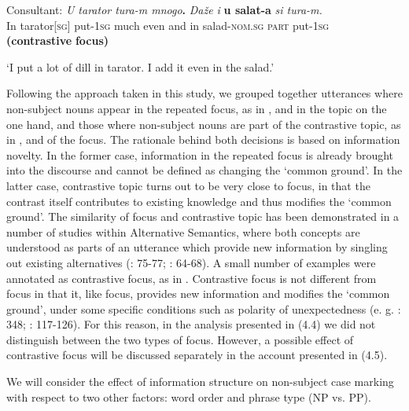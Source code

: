 \documentclass[output=paper]{langscibook}
\begin{document}
       Consultant:   \textit{U tarator tura-m       mnogo}\textbf{.         }\textit{Daže    i}\textbf{   \textbf{u} \textbf{salat-a}               }\textit{si      tura-m.} \\
                              In tarator[\textsc{sg}]  put-1\textsc{sg}  much      even  and  in salad-\textsc{nom.sg}    \textsc{part}   put-1\textsc{sg}  \textbf{\\
}                                                                              \textbf{(contrastive} \textbf{focus)}

      ‘I put a lot of dill in tarator. I add it even in the salad.’

Following the approach taken in this study, we grouped together utterances where non-subject nouns appear in the repeated focus, as in , and in the topic on the one hand, and those where non-subject nouns are part of the contrastive topic, as in , and of the focus. The rationale behind both decisions is based on information novelty. In the former case, information in the repeated focus is already brought into the discourse and cannot be defined as changing the ‘common ground’. In the latter case, contrastive topic turns out to be very close to focus, in that the contrast itself contributes to existing knowledge and thus modifies the ‘common ground’. The similarity of focus and contrastive topic has been demonstrated in a number of studies within Alternative Semantics, where both concepts are understood as parts of an utterance which provide new information by singling out existing alternatives (\citealt{Rooth1992}: 75-77; \citealt{Büring2016}: 64-68). A small number of examples were annotated as contrastive focus, as in . Contrastive focus is not different from focus in that it, like focus, provides new information and modifies the ‘common ground’, under some specific conditions such as polarity of unexpectedness (e. g. \citealt{Zimmermann2008}: 348; \citealt{Goodhue2022}: 117-126). For this reason, in the analysis presented in (4.4) we did not distinguish between the two types of focus. However, a possible effect of contrastive focus will be discussed separately in the account presented in (4.5). 

We will consider the effect of information structure on non-subject case marking with respect to two other factors: word order and phrase type (NP vs. PP).
\end{document}
